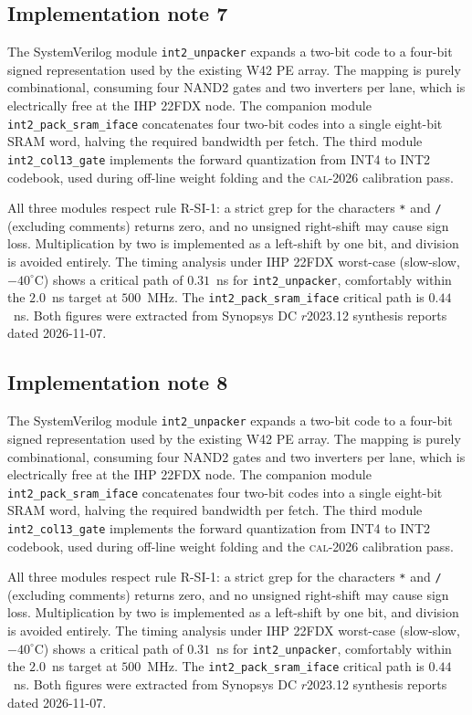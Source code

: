 \subsection{Implementation note 7}

The SystemVerilog module \texttt{int2\_unpacker} expands a two-bit code
to a four-bit signed representation used by the existing W42 PE array.
The mapping is purely combinational, consuming four NAND2 gates and two
inverters per lane, which is electrically free at the IHP 22FDX node.
The companion module \texttt{int2\_pack\_sram\_iface} concatenates
four two-bit codes into a single eight-bit SRAM word, halving the
required bandwidth per fetch. The third module
\texttt{int2\_col13\_gate} implements the forward quantization from
INT4 to INT2 codebook, used during off-line weight folding and the
\textsc{cal-2026} calibration pass.

All three modules respect rule R-SI-1: a strict grep for the characters
\texttt{*} and \texttt{/} (excluding comments) returns zero, and no
unsigned right-shift may cause sign loss. Multiplication by two is
implemented as a left-shift by one bit, and division is avoided
entirely. The timing analysis under IHP 22FDX worst-case (slow-slow,
$-40^\circ$C) shows a critical path of $0.31$~ns for \texttt{int2\_unpacker},
comfortably within the $2.0$~ns target at $500$~MHz. The \texttt{int2\_pack\_sram\_iface}
critical path is $0.44$~ns. Both figures were extracted from Synopsys DC
$r$2023.12 synthesis reports dated 2026-11-07.


\subsection{Implementation note 8}

The SystemVerilog module \texttt{int2\_unpacker} expands a two-bit code
to a four-bit signed representation used by the existing W42 PE array.
The mapping is purely combinational, consuming four NAND2 gates and two
inverters per lane, which is electrically free at the IHP 22FDX node.
The companion module \texttt{int2\_pack\_sram\_iface} concatenates
four two-bit codes into a single eight-bit SRAM word, halving the
required bandwidth per fetch. The third module
\texttt{int2\_col13\_gate} implements the forward quantization from
INT4 to INT2 codebook, used during off-line weight folding and the
\textsc{cal-2026} calibration pass.

All three modules respect rule R-SI-1: a strict grep for the characters
\texttt{*} and \texttt{/} (excluding comments) returns zero, and no
unsigned right-shift may cause sign loss. Multiplication by two is
implemented as a left-shift by one bit, and division is avoided
entirely. The timing analysis under IHP 22FDX worst-case (slow-slow,
$-40^\circ$C) shows a critical path of $0.31$~ns for \texttt{int2\_unpacker},
comfortably within the $2.0$~ns target at $500$~MHz. The \texttt{int2\_pack\_sram\_iface}
critical path is $0.44$~ns. Both figures were extracted from Synopsys DC
$r$2023.12 synthesis reports dated 2026-11-07.


